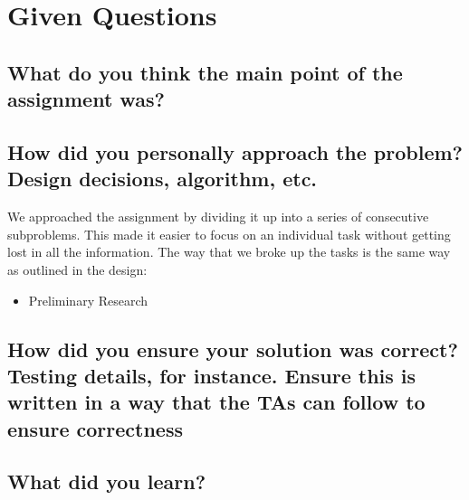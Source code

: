 \documentclass[10pt, onecolumn, letterpaper, draftclsnofoot]{IEEEtran}
\begin{document}
\section{Given Questions}
\subsection{What do you think the main point of the assignment was?}

\subsection{How did you personally approach the problem? Design decisions, algorithm, etc.}
\noindent We approached the assignment by dividing it up into a series of consecutive subproblems. This made it easier to focus on an individual task without getting lost in all the information. The way that we broke up the tasks is the same way as outlined in the design:

\begin{itemize}
\item{Preliminary Research} \\

\end{itemize}


\subsection{How did you ensure your solution was correct? Testing details, for instance. Ensure this is written in a way that the TAs can follow to ensure correctness}

\subsection{What did you learn?}
\end{document}
